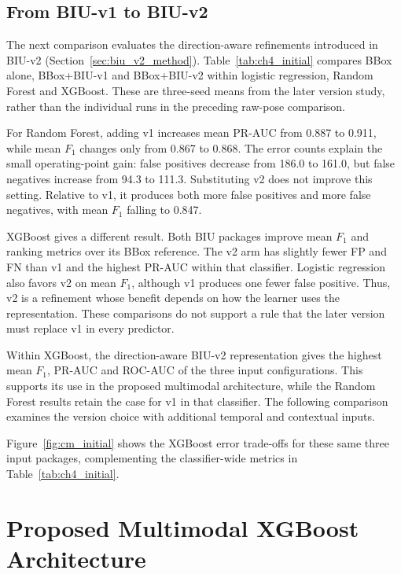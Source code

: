 \FloatBarrier
\subsection{From BIU-v1 to BIU-v2}

The next comparison evaluates the direction-aware refinements introduced in BIU-v2
(Section~\ref{sec:biu_v2_method}). Table~\ref{tab:ch4_initial} compares BBox alone,
BBox+BIU-v1 and BBox+BIU-v2 within logistic regression, Random Forest and XGBoost.
These are three-seed means from the later version study, rather than the individual
runs in the preceding raw-pose comparison.



For Random Forest, adding v1 increases mean PR-AUC from 0.887 to 0.911, while mean $F_1$
changes only from 0.867 to 0.868. The error counts explain the small operating-point gain:
false positives decrease from 186.0 to 161.0, but false negatives increase from 94.3 to
111.3. Substituting v2 does not improve this setting. Relative to v1, it produces
both more false positives and more false negatives, with mean $F_1$ falling to 0.847.

XGBoost gives a different result. Both BIU packages improve mean $F_1$ and ranking metrics
over its BBox reference. The v2 arm has slightly fewer FP and FN than v1 and the
highest PR-AUC within that classifier. Logistic regression also favors v2 on mean
$F_1$, although v1 produces one fewer false positive. Thus, v2 is a refinement whose
benefit depends on how the learner uses the representation. These comparisons do not
support a rule that the later version must replace v1 in every predictor.

Within XGBoost, the direction-aware BIU-v2 representation gives the highest mean
$F_1$, PR-AUC and ROC-AUC of the three input configurations. This supports its use
in the proposed multimodal architecture, while the Random Forest results retain the
case for v1 in that classifier. The following comparison examines the version choice with additional temporal and
contextual inputs.

Figure~\ref{fig:cm_initial} shows the XGBoost error trade-offs for these same three
input packages, complementing the classifier-wide metrics in Table~\ref{tab:ch4_initial}.


\FloatBarrier
\section{Proposed Multimodal XGBoost Architecture}\label{sec:ch4_architecture}

